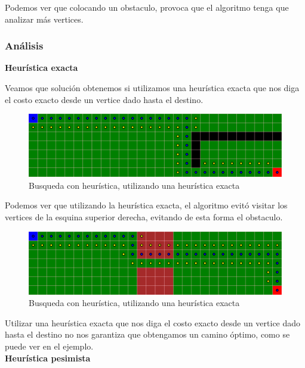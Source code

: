 Podemos ver que colocando un obstaculo, provoca que el algoritmo tenga que analizar más vertices.

\subsubsection{Análisis}
\textbf{Heurística exacta}

Veamos que solución obtenemos si utilizamos una heurística exacta que nos diga el costo exacto desde un vertice dado hasta el destino.


\begin{figure}[H]
\centering
\includegraphics[width=\textwidth]{BestSearch/grafo3HeuristicaExacta.png}
\caption{Busqueda con heurística, utilizando una heurística exacta}
\end{figure}
Podemos ver que utilizando la heurística exacta, el algoritmo evitó visitar los vertices de la esquina superior derecha, evitando de esta forma el obstaculo.

\begin{figure}[H]
\centering
\includegraphics[width=\textwidth]{BestSearch/grafo1HeuristicaExacta.png}
\caption{Busqueda con heurística, utilizando una heurística exacta}
\end{figure}
Utilizar una heurística exacta que nos diga el costo exacto desde un vertice dado hasta el destino no nos garantiza que obtengamos un camino óptimo, como se puede ver en el ejemplo.
\\


\textbf{Heurística pesimista}

